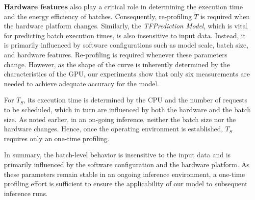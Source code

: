 \textbf{Hardware features} also play a critical role in determining the execution time and the energy efficiency of batches. 
Consequently, re-profiling $T$ is required when the hardware platform changes.
Similarly, the \textit{TFPrediction Model}, which is vital for predicting batch execution times, is also insensitive to input data. 
Instead, it is primarily influenced by software configurations such as model scale, batch size, and hardware features. 
Re-profiling is required whenever these parameters change. 
However, as the shape of the curve is inherently determined by the characteristics of the GPU, our experiments show that only six measurements are needed to achieve adequate accuracy for the model.

For $T_S$, its execution time is determined by the CPU and the number of requests to be scheduled, which in turn are influenced by both the hardware and the batch size. 
As noted earlier, in an on-going inference, neither the batch size nor the hardware changes. 
Hence, once the operating environment is established, $T_S$ requires only an one-time profiling.


In summary, the batch-level behavior is insensitive to the input data and is primarily influenced by the software configuration and the hardware platform.  
As these parameters remain stable in an ongoing inference environment, a one-time profiling effort is sufficient to ensure the applicability of our model to subsequent inference runs. 


